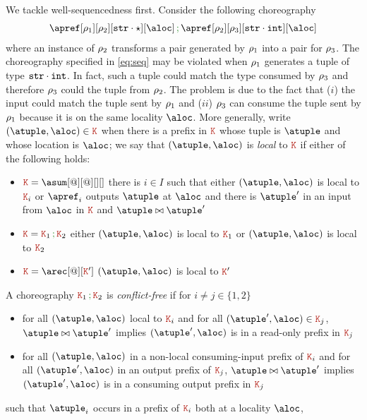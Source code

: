 We tackle well-sequencedness first.
%
Consider the following choreography
\begin{align}\label{eq:seq}
  \apref[\arole_1][\arole_2][{\asort[str] \cdot \wildcard}][\aloc] \seqop
  \apref[\arole_2][\arole_3][{\asort[str] \cdot \asort[int]}][\aloc]
\end{align}
%
where an instance of $\arole_2$ transforms a pair generated by
$\arole_1$ into a pair for $\arole_3$.
%
The choreography specified in \eqref{eq:seq} may be violated when
$\arole_1$ generates a tuple of type $\asort[str] \cdot \asort[int]$.
%
In fact, such a tuple could match the type consumed by $\arole_3$ and
therefore $\arole_3$ could  the tuple from $\arole_2$.
%
The problem is due to the fact that ($i$) the input could match the
tuple sent by $\arole_1$ and ($ii$) $\arole_3$ can consume the tuple
sent by $\arole_1$ because it is on the same locality $\aloc$.
%
More generally, write $(\atuple, \aloc) \in \aK$ when there is a
prefix in $\aK$ whose tuple is $\atuple$ and whose location is
$\aloc$; we say that $(\atuple, \aloc)$ is \emph{local} to $\aK$ if
either of the following holds:
\begin{itemize}
\item $\aK = \asum[@][@][][]$ there is $i \in I$ such that either
  $(\atuple, \aloc)$ is local to $\aK_i$ or $\apref_i$ outputs
  $\atuple$ at $\aloc$ and there is $\atuple'$ in an input from
  $\aloc$ in $\aK$ and $\atuple \matches \atuple'$
\item $\aK = \aK_1 \seqop \aK_2$ either $(\atuple, \aloc)$ is local to
  $\aK_1$ or   $(\atuple, \aloc)$ is local to $\aK_2$
\item $\aK = \arec[@][\aK']$ $(\atuple, \aloc)$ is local to $\aK'$
\end{itemize}
%
A choreography $\aK_1 \seqop \aK_2$ is \emph{conflict-free} if for
$i \neq j \in \{1,2\}$
%
\begin{itemize}
\item for all $(\atuple,\aloc)$ local to $\aK_i$ and for all
  $(\atuple', \aloc) \in \aK_j$, $\atuple \matches \atuple'$ implies
  $(\atuple', \aloc)$ is in a read-only prefix in $\aK_j$
\item for all $(\atuple,\aloc)$ in a non-local consuming-input prefix
  of $\aK_i$ and for all $(\atuple', \aloc)$ in an output prefix of
  $\aK_j$, $\atuple \matches \atuple'$ implies $(\atuple',\aloc)$ is
  in a consuming output prefix in $\aK_j$
  
\end{itemize}
such that $\atuple_i$ occurs in a prefix of $\aK_i$ both at a locality
$\aloc$, 

